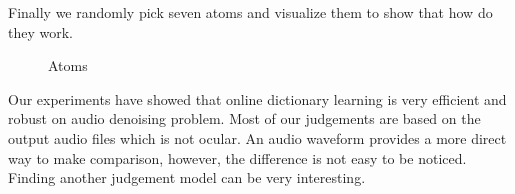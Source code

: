 \documentclass[UTF8]{article}
\begin{document}
Finally we randomly pick seven atoms and visualize them to show that how do they work.

\begin{figure}[H]
    \centering
    \caption{Atoms}
\end{figure}

Our experiments have showed that online dictionary learning is very efficient and robust on audio denoising problem. Most of our judgements are based on the output audio files which is not ocular. An audio waveform provides a more direct way to make comparison, however, the difference is not easy to be noticed. Finding another judgement model can be very interesting.



\nocite{*}
\end{document}
